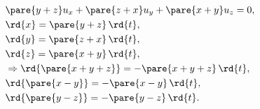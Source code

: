 \documentclass[hidelinks]{ctexart}
\begin{document}
\begin{align*}
    &\pare{y+z}u_x + \pare{z+x}u_y + \pare{x+y}u_z = 0, \\
    &\rd{x} = \pare{y+z}\,\rd{t},\\
    &\rd{y} = \pare{z+x}\,\rd{t},\\
    &\rd{z} = \pare{x+y}\,\rd{t},\\
    &\Rightarrow \rd{\pare{x+y+z}} = -\pare{x+y+z}\,\rd{t},\\
    &\rd{\pare{x-y}} = -\pare{x-y}\,\rd{t},\\
    &\rd{\pare{y-z}} = -\pare{y-z}\,\rd{t}.
\end{align*}
\end{document}
